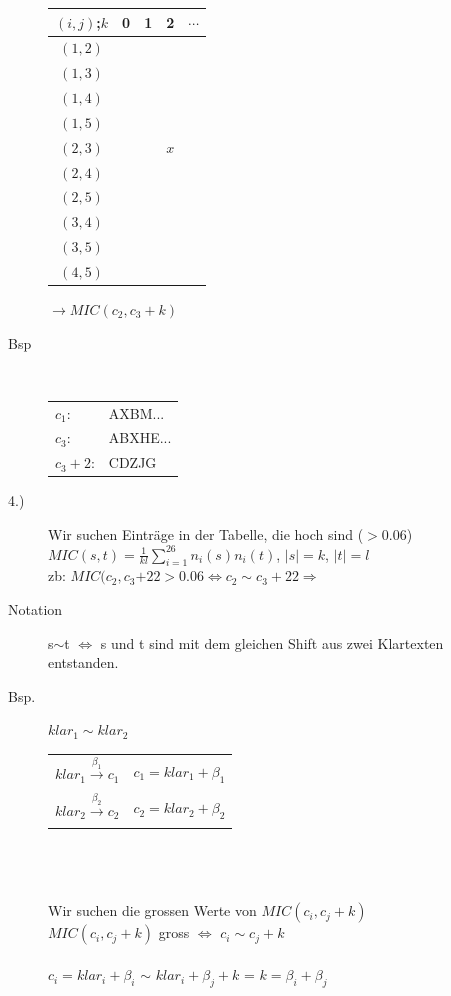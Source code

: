 \documentclass[10pt]{article}
\newcommand{\Ra}{\Rightarrow}
\newcommand{\Abs}[1]{\left| #1 \right|} %
\newcommand{\Sum}[2]{\sum_{#2}^{#1}} %
\newcommand{\Oneover}[1]{\frac{1}{#1}} %
\begin{document}
\begin{description}
 \begin{tabular}{|c|c|c|c|c|}\hline
  $(i,j)$;$k$&0&1&2&$\cdots$\\\hline
  $(1,2)$&&&&\\
  $(1,3)$&&&&\\
  $(1,4)$&&&&\\
  $(1,5)$&&&&\\\hline
  $(2,3)$&&&$x$&\\\hline
  $(2,4)$&&&&\\
  $(2,5)$&&&&\\
  $(3,4)$&&&&\\
  $(3,5)$&&&&\\
  $(4,5)$&&&&\\\hline
 \end{tabular}$\to MIC(c_2,c_3+k)$\\
	\item[Bsp] \hfill \\
		\begin{tabular}{l l}
			$c_1$: & AXBM...\\
			$c_3$: & ABXHE... \\
			\hline
			$c_3+2$: & CDZJG \\
		\end{tabular}
	\item[4.)] Wir suchen Einträge in der Tabelle, die hoch sind ($> 0.06$) \\
		$MIC(s,t)=\Oneover{kl}\Sum{26}{i=1}n_i(s)n_i(t)$, $\Abs{s}=k$, $\Abs{t}=l$\\
		zb: $MIC(c_2,c_3{+22} > 0.06 \Longleftrightarrow c_2 \sim c_3+22 \Ra$ \\
	\item[Notation] s$\sim$t $\Longleftrightarrow$ s und t sind mit dem gleichen Shift aus zwei Klartexten entstanden.
	\item[Bsp.] $klar_1 \sim klar_2$ \\
		\begin{tabular}{l | l}
			$klar_1 \xrightarrow[]{\beta_1} c_1$ & $c_1 = klar_1+\beta_1$ \\
			$klar_2 \xrightarrow[]{\beta_2} c_2$ & $c_2 = klar_2+\beta_2$ \\
		\end{tabular} \\ \\ \\
		Wir suchen die grossen Werte von $MIC(c_i, c_j +k)$ \\
		$MIC(c_i, c_j +k)$ gross $\Longleftrightarrow$ $c_i \sim c_j + k$ \\ \\
		$c_i=klar_i+\beta_i$ $\sim$ $klar_i + \beta_j + k$ = {\color{red} $k = \beta_i + \beta_j$ }\\
		

\end{description}
\end{document}
